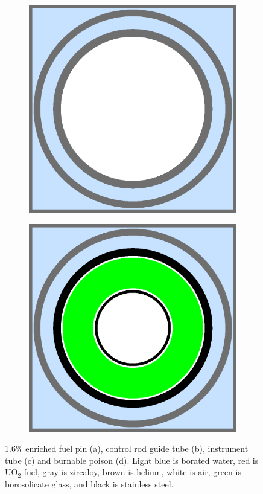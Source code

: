 \begin{figure}[h!]
\begin{subfigure}{.5\textwidth}
  \caption{}
  \label{fig:chap7-pin-crgt}
\end{subfigure}
\begin{subfigure}{.5\textwidth}
  \centering
  \includegraphics[width=0.9\linewidth]{figures/benchmarks/instr-tube}
  \caption{}
  \label{fig:chap7-instr-tube}
\end{subfigure}%
\begin{subfigure}{.5\textwidth}
  \centering
  \includegraphics[width=0.9\linewidth]{figures/benchmarks/burn-abs}
  \caption{}
  \label{fig:chap7-bp}
\end{subfigure}%
\caption[BEAVRS pin cell geometries]{1.6\% enriched fuel pin (a), control rod guide tube (b), instrument tube (c) and burnable poison (d). Light blue is borated water, red is UO$_2$ fuel, gray is zircaloy, brown is helium, white is air, green is borosolicate glass, and black is stainless steel.}
\label{fig:chap7-pin-cells}
\end{figure}

